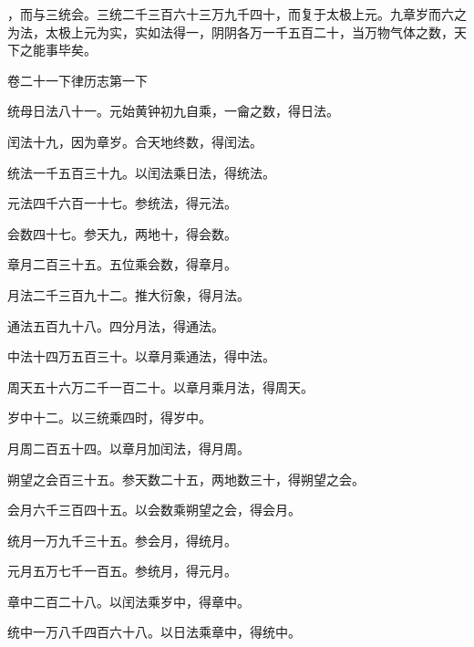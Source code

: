 \documentclass[12pt,UTF8]{ctexbook}
\begin{document}
，而与三统会。三统二千三百六十三万九千四十，而复于太极上元。九章岁而六之为法，太极上元为实，实如法得一，阴阴各万一千五百二十，当万物气体之数，天下之能事毕矣。





卷二十一下律历志第一下



统母日法八十一。元始黄钟初九自乘，一龠之数，得日法。



闰法十九，因为章岁。合天地终数，得闰法。



统法一千五百三十九。以闰法乘日法，得统法。



元法四千六百一十七。参统法，得元法。



会数四十七。参天九，两地十，得会数。



章月二百三十五。五位乘会数，得章月。



月法二千三百九十二。推大衍象，得月法。



通法五百九十八。四分月法，得通法。



中法十四万五百三十。以章月乘通法，得中法。



周天五十六万二千一百二十。以章月乘月法，得周天。



岁中十二。以三统乘四时，得岁中。



月周二百五十四。以章月加闰法，得月周。



朔望之会百三十五。参天数二十五，两地数三十，得朔望之会。



会月六千三百四十五。以会数乘朔望之会，得会月。



统月一万九千三十五。参会月，得统月。



元月五万七千一百五。参统月，得元月。



章中二百二十八。以闰法乘岁中，得章中。



统中一万八千四百六十八。以日法乘章中，得统中。
\end{document}
